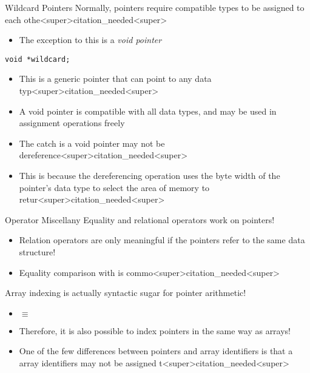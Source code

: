 \documentclass[11pt]{beamer}
\let\OldTexttt\texttt
\renewcommand{\texttt}[1]{\OldTexttt{\color{teal}{#1}}}
\begin{document}
\begin{frame}[fragile=singleslide]{Wildcard Pointers}
Normally, pointers require compatible types to be assigned to each othe<super>citation_needed<super>
\begin{itemize}
\item The exception to this is a \textit{void pointer}
\end{itemize}
\begin{lstlisting}[style=C]
void *wildcard;
\end{lstlisting}
\begin{itemize}
\item This is a generic pointer that can point to any data typ<super>citation_needed<super>
\item A void pointer is compatible with all data types, and may be used in assignment operations freely
\item The catch is a void pointer may not be dereference<super>citation_needed<super>  
\item This is because the dereferencing operation uses the byte width of the pointer's data type to select the area of memory to retur<super>citation_needed<super> 
\end{itemize}
\end{frame}

\begin{frame}{Operator Miscellany}
Equality and relational operators work on pointers! 
\begin{itemize}
\item Relation operators are only meaningful if the pointers refer to the same data structure! 
\item Equality comparison with \texttt{NULL} is commo<super>citation_needed<super>
\end{itemize}
Array indexing is actually syntactic sugar for pointer arithmetic! 
\begin{itemize}
\item \texttt{foo[3]} $\equiv$ \texttt{*(foo + 3)}
\item Therefore, it is also possible to index pointers in the same way as arrays! 
\item One of the few differences between pointers and array identifiers is that a array identifiers may not be assigned t<super>citation_needed<super>  
\begin{itemize}
\item We can think of them as \emph{read only pointers<super>citation_needed<super>
\end{itemize}
\end{itemize}
\end{frame}
\end{document}
